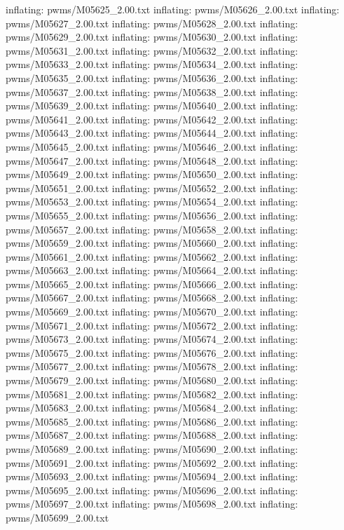 \documentclass[letterpaper,10pt,english]{sphinxmanual}
\begin{document}
{\begin{sphinxVerbatim}[commandchars=\\\{\}]
  inflating: pwms/M05625\_2.00.txt
  inflating: pwms/M05626\_2.00.txt
  inflating: pwms/M05627\_2.00.txt
  inflating: pwms/M05628\_2.00.txt
  inflating: pwms/M05629\_2.00.txt
  inflating: pwms/M05630\_2.00.txt
  inflating: pwms/M05631\_2.00.txt
  inflating: pwms/M05632\_2.00.txt
  inflating: pwms/M05633\_2.00.txt
  inflating: pwms/M05634\_2.00.txt
  inflating: pwms/M05635\_2.00.txt
  inflating: pwms/M05636\_2.00.txt
  inflating: pwms/M05637\_2.00.txt
  inflating: pwms/M05638\_2.00.txt
  inflating: pwms/M05639\_2.00.txt
  inflating: pwms/M05640\_2.00.txt
  inflating: pwms/M05641\_2.00.txt
  inflating: pwms/M05642\_2.00.txt
  inflating: pwms/M05643\_2.00.txt
  inflating: pwms/M05644\_2.00.txt
  inflating: pwms/M05645\_2.00.txt
  inflating: pwms/M05646\_2.00.txt
  inflating: pwms/M05647\_2.00.txt
  inflating: pwms/M05648\_2.00.txt
  inflating: pwms/M05649\_2.00.txt
  inflating: pwms/M05650\_2.00.txt
  inflating: pwms/M05651\_2.00.txt
  inflating: pwms/M05652\_2.00.txt
  inflating: pwms/M05653\_2.00.txt
  inflating: pwms/M05654\_2.00.txt
  inflating: pwms/M05655\_2.00.txt
  inflating: pwms/M05656\_2.00.txt
  inflating: pwms/M05657\_2.00.txt
  inflating: pwms/M05658\_2.00.txt
  inflating: pwms/M05659\_2.00.txt
  inflating: pwms/M05660\_2.00.txt
  inflating: pwms/M05661\_2.00.txt
  inflating: pwms/M05662\_2.00.txt
  inflating: pwms/M05663\_2.00.txt
  inflating: pwms/M05664\_2.00.txt
  inflating: pwms/M05665\_2.00.txt
  inflating: pwms/M05666\_2.00.txt
  inflating: pwms/M05667\_2.00.txt
  inflating: pwms/M05668\_2.00.txt
  inflating: pwms/M05669\_2.00.txt
  inflating: pwms/M05670\_2.00.txt
  inflating: pwms/M05671\_2.00.txt
  inflating: pwms/M05672\_2.00.txt
  inflating: pwms/M05673\_2.00.txt
  inflating: pwms/M05674\_2.00.txt
  inflating: pwms/M05675\_2.00.txt
  inflating: pwms/M05676\_2.00.txt
  inflating: pwms/M05677\_2.00.txt
  inflating: pwms/M05678\_2.00.txt
  inflating: pwms/M05679\_2.00.txt
  inflating: pwms/M05680\_2.00.txt
  inflating: pwms/M05681\_2.00.txt
  inflating: pwms/M05682\_2.00.txt
  inflating: pwms/M05683\_2.00.txt
  inflating: pwms/M05684\_2.00.txt
  inflating: pwms/M05685\_2.00.txt
  inflating: pwms/M05686\_2.00.txt
  inflating: pwms/M05687\_2.00.txt
  inflating: pwms/M05688\_2.00.txt
  inflating: pwms/M05689\_2.00.txt
  inflating: pwms/M05690\_2.00.txt
  inflating: pwms/M05691\_2.00.txt
  inflating: pwms/M05692\_2.00.txt
  inflating: pwms/M05693\_2.00.txt
  inflating: pwms/M05694\_2.00.txt
  inflating: pwms/M05695\_2.00.txt
  inflating: pwms/M05696\_2.00.txt
  inflating: pwms/M05697\_2.00.txt
  inflating: pwms/M05698\_2.00.txt
  inflating: pwms/M05699\_2.00.txt

\end{sphinxVerbatim}}
\end{document}
